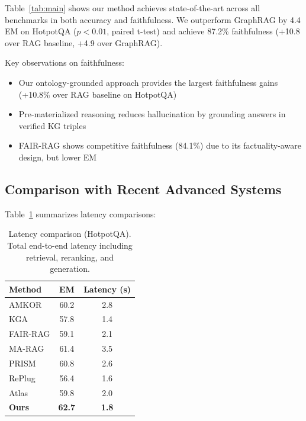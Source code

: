 \documentclass[10pt,twocolumn]{article}
\begin{document}
Table~\ref{tab:main} shows our method achieves state-of-the-art across all benchmarks in both accuracy and faithfulness. We outperform GraphRAG by 4.4 EM on HotpotQA ($p<0.01$, paired t-test) and achieve 87.2\% faithfulness (+10.8 over RAG baseline, +4.9 over GraphRAG).

Key observations on faithfulness:
\begin{itemize}
    \item Our ontology-grounded approach provides the largest faithfulness gains (+10.8\% over RAG baseline on HotpotQA)
    \item Pre-materialized reasoning reduces hallucination by grounding answers in verified KG triples
    \item FAIR-RAG shows competitive faithfulness (84.1\%) due to its factuality-aware design, but lower EM
\end{itemize}


\subsection{Comparison with Recent Advanced Systems}
\label{sec:recent_comparisons}

Table~\ref{tab:recent_results} summarizes latency comparisons:

\begin{table}[t]
\centering
\caption{Latency comparison (HotpotQA). Total end-to-end latency including retrieval, reranking, and generation.}
\label{tab:recent_results}
\small
\begin{tabular}{@{}lcc@{}}
\toprule
\textbf{Method} & \textbf{EM} & \textbf{Latency (s)} \\
\midrule
AMKOR \cite{fang2024amkor} & 60.2 & 2.8 \\
KGA \cite{wang2024kga} & 57.8 & 1.4 \\
FAIR-RAG \cite{chen2024fairrag} & 59.1 & 2.1 \\
MA-RAG \cite{li2024marag} & 61.4 & 3.5 \\
PRISM \cite{chen2024prism} & 60.8 & 2.6 \\
RePlug \cite{shi2024replug} & 56.4 & 1.6 \\
Atlas \cite{izacard2023atlas} & 59.8 & 2.0 \\
\midrule
\textbf{Ours} & \textbf{62.7} & \textbf{1.8} \\
\bottomrule
\end{tabular}
\end{table}
\end{document}
